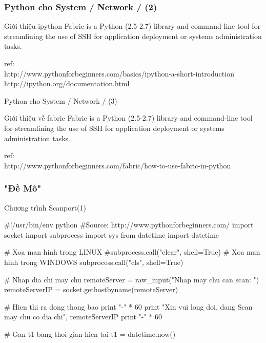 \documentclass[12pt]{beamer}
\newcommand\Fontvi{\fontsize{6}{7.2}\selectfont} %
\newcommand\sFontvi{\fontsize{8}{7.2}\selectfont} %
\begin{document}
\begin{frame}[fragile]
\frametitle{Python cho System / Network / (2) }
\sFontvi
\begin{block}{Giới thiệu ipython}\label{Gioi thieu ipython}
Fabric is a Python (2.5-2.7) library and command-line tool for streamlining the use of SSH for application deployment or systems administration tasks.
\end{block}
ref:\\
http://www.pythonforbeginners.com/basics/ipython-a-short-introduction\\
http://ipython.org/documentation.html
\end{frame}
\begin{frame}{Python cho System / Network / (3) }
\sFontvi
\begin{block}{Giới thiệu về fabric} \label{fabric}
Fabric is a Python (2.5-2.7) library and command-line tool for streamlining the use of SSH for application deployment or systems administration tasks.
\end{block}
ref:\\
http://www.pythonforbeginners.com/fabric/how-to-use-fabric-in-python
\end{frame}
\label{Demo}
\begin{frame}[fragile] %
\frametitle{"Đề Mô"}
\label{Chuong trinh scan port phan 1}
\begin{block}{Chương trình Scanport(1)}
\Fontvi
\begin{python}
#!/usr/bin/env python
#Source: http://www.pythonforbeginners.com/
import socket
import subprocess
import sys
from datetime import datetime

# Xoa man hinh trong LINUX
#subprocess.call("clear", shell=True)
# Xoa man hinh trong WINDOWS
subprocess.call("cls", shell=True)

# Nhap dia chi may chu
remoteServer    = raw_input("Nhap may chu can scan: ")
remoteServerIP  = socket.gethostbyname(remoteServer)

# Hien thi ra dong thong bao
print "-" * 60
print "Xin vui long doi, dang Scan may chu co dia chi", remoteServerIP
print "-" * 60

# Gan t1 bang thoi gian hien tai
t1 = datetime.now()
\end{python}
\end{block}
\end{frame}
\end{document}
